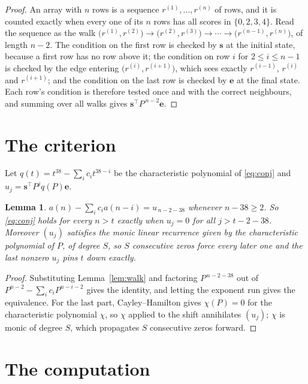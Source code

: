 \documentclass[11pt,a4paper]{article}
\theoremstyle{plain}
\newtheorem{lemma}[theorem]{Lemma}
\theoremstyle{definition}
\begin{document}
\begin{proof}
An array with $n$ rows is a sequence $r^{(1)},\dots,r^{(n)}$ of rows, and it is counted
exactly when every one of its $n$ rows has all scores in $\{0,2,3,4\}$. Read the sequence as the
walk $\bigl(r^{(1)},r^{(2)}\bigr)\to\bigl(r^{(2)},r^{(3)}\bigr)\to\cdots\to
\bigl(r^{(n-1)},r^{(n)}\bigr)$, of length $n-2$. The condition on the first row is
checked by $\mathbf{s}$ at the initial state, because a first row has no row above it; the
condition on row $i$ for $2\le i\le n-1$ is checked by the edge entering
$\bigl(r^{(i)},r^{(i+1)}\bigr)$, which sees exactly $r^{(i-1)}$, $r^{(i)}$ and
$r^{(i+1)}$; and the condition on the last row is checked by $\mathbf{e}$ at the final
state. Each row's condition is therefore tested once and with the correct neighbours, and
summing over all walks gives $\mathbf{s}^{\!\top}P^{\,n-2}\mathbf{e}$.
\end{proof}

\section{The criterion}

Let $q(t)=t^{38}-\sum_i c_i t^{38-i}$ be the characteristic polynomial of
\eqref{eq:conj} and $u_j=\mathbf{s}^{\!\top}P^{j}q(P)\mathbf{e}$.

\begin{lemma}\label{lem:crit}
$a(n)-\sum_i c_i a(n-i)=u_{\,n-2-38}$ whenever $n-38\ge2$. So \eqref{eq:conj}
holds for every $n>t$ exactly when $u_j=0$ for all $j>t-2-38$. Moreover $(u_j)$
satisfies the monic linear recurrence given by the characteristic polynomial of $P$, of
degree $S$, so $S$ consecutive zeros force every later one and the last nonzero $u_j$ pins
$t$ down exactly.
\end{lemma}

\begin{proof}
Substituting Lemma~\ref{lem:walk} and factoring $P^{\,n-2-38}$ out of
$P^{n-2}-\sum_i c_i P^{n-i-2}$ gives the identity, and letting the exponent run gives the
equivalence. For the last part, Cayley--Hamilton gives $\chi(P)=0$ for the characteristic
polynomial $\chi$, so $\chi$ applied to the shift annihilates $(u_j)$; $\chi$ is monic of
degree $S$, which propagates $S$ consecutive zeros forward.
\end{proof}

\section{The computation}
\end{document}
